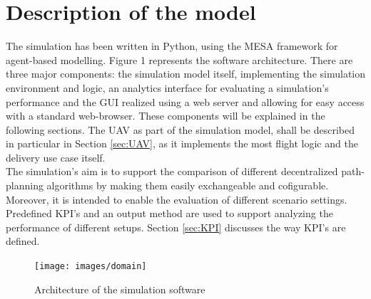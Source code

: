 \section{Description of the model}\label{sec:model}
The simulation has been written in Python, using the MESA \cite{masad.2015} framework for agent-based modelling. Figure 1 represents the software architecture. There are three major components: the simulation model itself, implementing the simulation environment and logic, an analytics interface for evaluating a simulation's performance and the GUI realized using a web server and allowing for easy access with a standard web-browser. These components will be explained in the following sections. The UAV as part of the simulation model, shall be described in particular in Section \ref{sec:UAV}, as it implements the most flight logic and the delivery use case itself.\\
The simulation's aim is to support the comparison of different decentralized 
path-planning algorithms by making them easily exchangeable and cofigurable. 
Moreover, it is intended to enable the evaluation of different scenario 
settings. Predefined KPI's and an output method are used to support analyzing 
the performance of different setups. Section \ref{sec:KPI} discusses the way 
KPI's are defined.\\
\begin{figure}[tbp]\label{fig:architecture}
	\centering
	\texttt{[image: images/domain]} 
	\caption{Architecture of the simulation software}
\end{figure}


